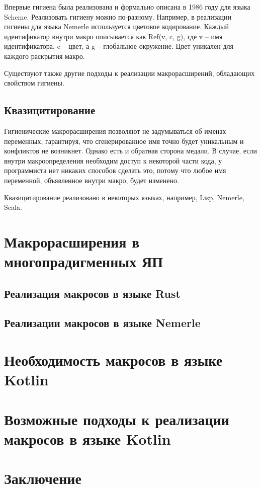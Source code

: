 Впервые гигиена была реализована и формально описана в 1986 году для языка Scheme\cite{Kohlbecker:1986:HME:319838.319859}. Реализовать гигиену можно по-разному. Например, в реализации гигиены для языка Nemerle используется цветовое кодирование\cite{Skalski:2005}. Каждый идентификатор внутри макро описывается как Ref(v, c, g), где v -- имя идентификатора, c -- цвет, а g -- глобальное окружение. Цвет уникален для каждого раскрытия макро.

Существуют также другие подходы к реализации макрорасширений, обладающих свойством гигиены\cite{Abelson:1996:SIC:547755}\cite{Herman:2010:TTH:1925552}\cite{clinger91hygienic}.

\subsection{Квазицитирование}

Гигиенические макрорасширения позволяют не задумываться об именах переменных, гарантируя, что сгенерированное имя точно будет уникальным и конфликтов не возникнет. Однако есть и обратная сторона медали. В случае, если внутри макроопределения необходим доступ к некоторой части кода, у программиста нет никаких способов сделать это, потому что любое имя переменной, объявленное внутри макро, будет изменено.

Квазицитирование реализовано в некоторых языках, например, Lisp\cite{Bawden1999}, Nemerle\cite{Skalski:2005},  Scala\cite{EPFL-REPORT-185242}.


\newpage
\section{Макрорасширения в многопрадигменных ЯП}


\subsection{Реализация макросов в языке Rust}


\subsection{Реализации макросов в языке Nemerle}

\newpage
\section{Необходимость макросов в языке Kotlin}

\newpage
\section{Возможные подходы к реализации макросов в языке Kotlin}

\newpage

\section{Заключение}

\newpage




